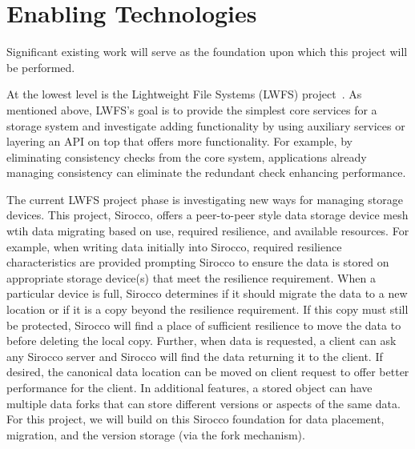 \section{Enabling Technologies}
\label{sec:enabling-technologies}
Significant existing work will serve as the foundation upon which this project
will be performed.

At the lowest level is the Lightweight File Systems (LWFS) project~\cite{lwfs}.
As mentioned above, LWFS's goal is to provide the simplest core services for
a storage system and investigate adding functionality by using auxiliary
services or layering an API on top that offers more functionality. For example,
by eliminating consistency checks from the core system, applications already
managing consistency can eliminate the redundant check enhancing performance.

The current LWFS project phase is investigating new ways for managing storage
devices. This project, Sirocco, offers a peer-to-peer style data storage device
mesh wtih data migrating based on use, required resilience, and available
resources. For example, when writing data initially into Sirocco, required
resilience characteristics are provided prompting Sirocco to ensure the data is
stored on appropriate storage device(s) that meet the resilience requirement.
When a particular device is full, Sirocco determines if it should migrate the
data to a new location or if it is a copy beyond the resilience requirement. If
this copy must still be protected, Sirocco will find a place of sufficient 
resilience to move the data to before deleting the local copy. Further, when
data is requested, a client can ask any Sirocco server and Sirocco will find
the data returning it to the client. If desired, the canonical data location
can be moved on client request to offer better performance for the client. In
additional features, a stored object can have multiple data forks that can
store different versions or aspects of the same data.  For this project, we
will build on this Sirocco foundation for data placement, migration, and the
version storage (via the fork mechanism). 

